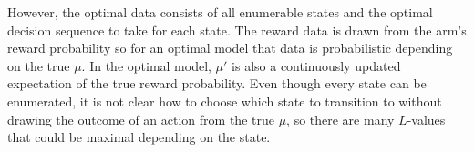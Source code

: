 However, the optimal data consists of all enumerable states and the optimal decision sequence to take for each state. The reward data is drawn from the arm's reward probability so for an optimal model that data is probabilistic depending on the true $\mu$. In the optimal model, $\mu'$ is also a continuously updated expectation of the true reward probability. Even though every state can be enumerated, it is not clear how to choose which state to transition to without drawing the outcome of an action from the true $\mu$, so there are many $L$-values that could be maximal depending on the state.
